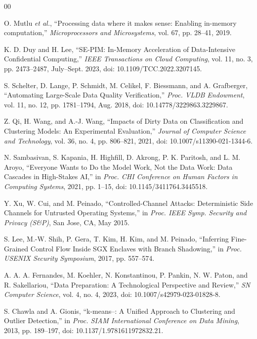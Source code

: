 \documentclass[conference]{IEEEtran}
\begin{document}
\balance
\begin{thebibliography}{00}

 O. Mutlu \textit{et al.}, ``Processing data where it makes sense: Enabling in-memory computation,'' \textit{Microprocessors and Microsystems}, vol. 67, pp. 28--41, 2019.

 K. D. Duy and H. Lee, ``SE-PIM: In-Memory Acceleration of Data-Intensive Confidential Computing,'' \textit{IEEE Transactions on Cloud Computing}, vol. 11, no. 3, pp. 2473--2487, July--Sept. 2023, doi: 10.1109/TCC.2022.3207145.

 S. Schelter, D. Lange, P. Schmidt, M. Celikel, F. Biessmann, and A. Grafberger, ``Automating Large-Scale Data Quality Verification,'' \textit{Proc. VLDB Endowment}, vol. 11, no. 12, pp. 1781--1794, Aug. 2018, doi: 10.14778/3229863.3229867.

 Z. Qi, H. Wang, and A.-J. Wang, ``Impacts of Dirty Data on Classification and Clustering Models: An Experimental Evaluation,'' \textit{Journal of Computer Science and Technology}, vol. 36, no. 4, pp. 806--821, 2021, doi: 10.1007/s11390-021-1344-6.

 N. Sambasivan, S. Kapania, H. Highfill, D. Akrong, P. K. Paritosh, and L. M. Aroyo, ``Everyone Wants to Do the Model Work, Not the Data Work: Data Cascades in High-Stakes AI,'' in \textit{Proc. CHI Conference on Human Factors in Computing Systems}, 2021, pp. 1--15, doi: 10.1145/3411764.3445518.

 Y. Xu, W. Cui, and M. Peinado, ``Controlled-Channel Attacks: Deterministic Side Channels for Untrusted Operating Systems,'' in \textit{Proc. IEEE Symp. Security and Privacy (S\&P)}, San Jose, CA, May 2015.

 S. Lee, M.-W. Shih, P. Gera, T. Kim, H. Kim, and M. Peinado, ``Inferring Fine-Grained Control Flow Inside SGX Enclaves with Branch Shadowing,'' in \textit{Proc. USENIX Security Symposium}, 2017, pp. 557--574.

 A. A. A. Fernandes, M. Koehler, N. Konstantinou, P. Pankin, N. W. Paton, and R. Sakellariou, ``Data Preparation: A Technological Perspective and Review,'' \textit{SN Computer Science}, vol. 4, no. 4, 2023, doi: 10.1007/s42979-023-01828-8.

 S. Chawla and A. Gionis, ``k-means--: A Unified Approach to Clustering and Outlier Detection,'' in \textit{Proc. SIAM International Conference on Data Mining}, 2013, pp. 189--197, doi: 10.1137/1.9781611972832.21.


\end{thebibliography}
\end{document}
